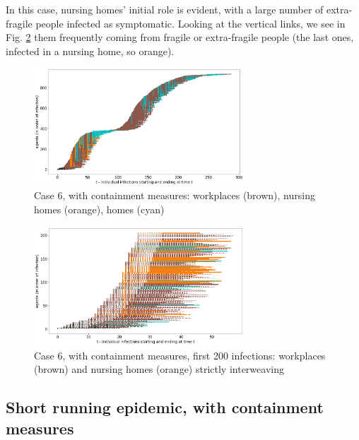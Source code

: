 \documentclass[11pt]{article}
\begin{document}
In this case, nursing homes' initial role is evident, with a large number of extra-fragile people infected as symptomatic. Looking at the vertical links, we see in Fig. \ref{8b} them frequently coming from fragile or extra-fragile people (the last ones, infected in a nursing home, so orange).

\begin{figure}[H]
\begin{center}
\includegraphics[width=0.7\textwidth]{with8a.png}%
\caption{Case 6, with containment measures: workplaces (brown), nursing homes (orange), homes (cyan)}
\label{8a}
\end{center}
\end{figure}

\begin{figure}[H]
\begin{center}
\includegraphics[width=0.7\textwidth]{with8b.png}%
\caption{Case 6, with containment measures, first 200 infections: workplaces (brown) and nursing homes (orange) strictly interweaving}
\label{8b}
\end{center}
\end{figure}

\subsection{Short running epidemic, with containment measures}
\end{document}
